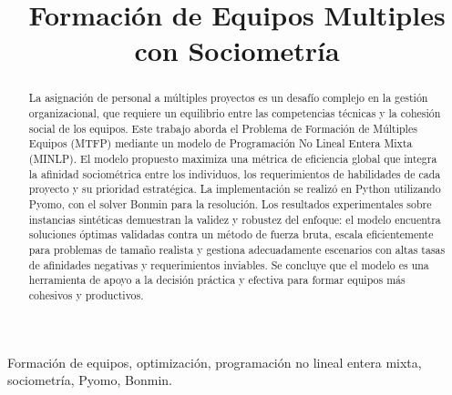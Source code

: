 \documentclass[conference]{IEEEtran}
\begin{document}
\title{Formación de Equipos Multiples con Sociometría}

\author{
}

\maketitle

\begin{abstract}
    La asignación de personal a múltiples proyectos es un desafío complejo en la gestión organizacional, que requiere un equilibrio entre las competencias técnicas y la cohesión social de los equipos. Este trabajo aborda el Problema de Formación de Múltiples Equipos (MTFP) mediante un modelo de Programación No Lineal Entera Mixta (MINLP). El modelo propuesto maximiza una métrica de eficiencia global que integra la afinidad sociométrica entre los individuos, los requerimientos de habilidades de cada proyecto y su prioridad estratégica. La implementación se realizó en Python utilizando Pyomo, con el solver Bonmin para la resolución. Los resultados experimentales sobre instancias sintéticas demuestran la validez y robustez del enfoque: el modelo encuentra soluciones óptimas validadas contra un método de fuerza bruta, escala eficientemente para problemas de tamaño realista y gestiona adecuadamente escenarios con altas tasas de afinidades negativas y requerimientos inviables. Se concluye que el modelo es una herramienta de apoyo a la decisión práctica y efectiva para formar equipos más cohesivos y productivos.
\end{abstract}
\begin{IEEEkeywords}
    Formación de equipos, optimización, programación no lineal entera mixta, sociometría, Pyomo, Bonmin.
\end{IEEEkeywords}
\end{document}
